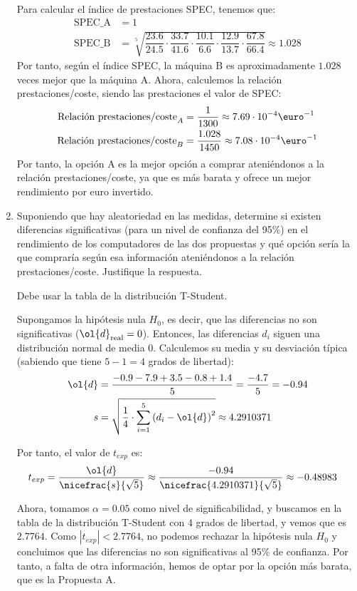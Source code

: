 \begin{ejercicio}
\begin{enumerate}
    Para calcular el índice de prestaciones SPEC, tenemos que:
\begin{align*}
    \text{SPEC\_A} &= 1\\
    \text{SPEC\_B} &= \sqrt[5]{\dfrac{23.6}{24.5} \cdot \dfrac{33.7}{41.6} \cdot \dfrac{10.1}{6.6} \cdot \dfrac{12.9}{13.7} \cdot \dfrac{67.8}{66.4}} \approx 1.028
\end{align*}
Por tanto, según el índice SPEC, la máquina B es aproximadamente $1.028$ veces mejor que la máquina A. Ahora, calculemos la relación prestaciones/coste, siendo las prestaciones el valor de SPEC:
\begin{align*}
    \text{Relación prestaciones/coste}_A &= \dfrac{1}{1300} \approx 7.69\cdot 10^{-4} \text{\euro}^{-1}\\
    \text{Relación prestaciones/coste}_B &= \dfrac{1.028}{1450} \approx 7.08\cdot 10^{-4} \text{\euro}^{-1}
\end{align*}
Por tanto, la opción A es la mejor opción a comprar ateniéndonos a la relación prestaciones/coste, ya que es más barata y ofrece un mejor rendimiento por euro invertido.
    \item Suponiendo que hay aleatoriedad en las medidas, determine si existen diferencias significativas (para un nivel de confianza del 95\%) en el rendimiento de los computadores de las dos propuestas y qué opción sería la que compraría según esa información ateniéndonos a la relación prestaciones/coste. Justifique la respuesta.
\begin{observacion}
Debe usar la tabla de la distribución T-Student.
\end{observacion}

Supongamos la hipótesis nula $H_0$, es decir, que las diferencias no son significativas ($\ol{d}_{\text{real}}=0$). Entonces, las diferencias $d_i$ siguen una distribución normal de media $0$. Calculemos su media y su desviación típica (sabiendo que tiene $5-1=4$ grados de libertad):
\begin{align*}
    \ol{d} &= \dfrac{-0.9 - 7.9 + 3.5 - 0.8 + 1.4}{5} = \dfrac{-4.7}{5} = -0.94\\
    s &= \sqrt{\dfrac{1}{4}\cdot \sum_{i=1}^5 \left(d_i-\ol{d}\right)^2} \approx 4.2910371
\end{align*}

Por tanto, el valor de $t_{exp}$ es:
\begin{align*}
    t_{exp} &= \dfrac{\ol{d}}{\nicefrac{s}{\sqrt{5}}} \approx \dfrac{-0.94}{\nicefrac{4.2910371}{\sqrt{5}}} \approx -0.48983
\end{align*}

Ahora, tomamos $\alpha=0.05$ como nivel de significabilidad, y buscamos en la tabla de la distribución T-Student con $4$ grados de libertad, y vemos que es $2.7764$. Como $|t_{exp}| < 2.7764$, no podemos rechazar la hipótesis nula $H_0$ y concluimos que las diferencias no son significativas al 95\% de confianza. Por tanto, a falta de otra información, hemos de optar por la opción más barata, que es la Propuesta A.
\end{enumerate}
\end{ejercicio}

